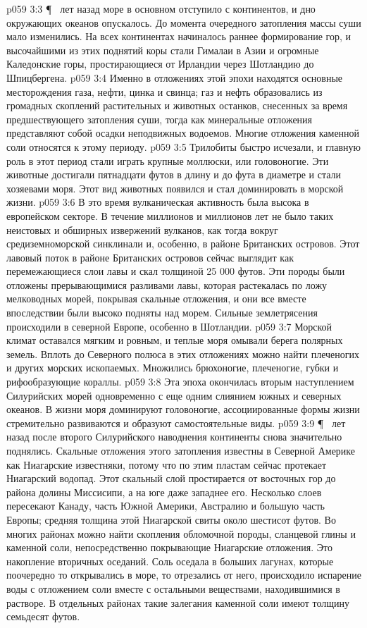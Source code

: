 \vs p059 3:3 \P\  лет назад море в основном отступило с континентов, и дно окружающих океанов опускалось. До момента очередного затопления массы суши мало изменились. На всех континентах начиналось раннее формирование гор, и высочайшими из этих поднятий коры стали Гималаи в Азии и огромные Каледонские горы, простирающиеся от Ирландии через Шотландию до Шпицбергена.
\vs p059 3:4 Именно в отложениях этой эпохи находятся основные месторождения газа, нефти, цинка и свинца; газ и нефть образовались из громадных скоплений растительных и животных останков, снесенных за время предшествующего затопления суши, тогда как минеральные отложения представляют собой осадки неподвижных водоемов. Многие отложения каменной соли относятся к этому периоду.
\vs p059 3:5 Трилобиты быстро исчезали, и главную роль в этот период стали играть крупные моллюски, или головоногие. Эти животные достигали пятнадцати футов в длину и до фута в диаметре и стали хозяевами моря. Этот вид животных появился  и стал доминировать в морской жизни.
\vs p059 3:6 В это время вулканическая активность была высока в европейском секторе. В течение миллионов и миллионов лет не было таких неистовых и обширных извержений вулканов, как тогда вокруг средиземноморской синклинали и, особенно, в районе Британских островов. Этот лавовый поток в районе Британских островов сейчас выглядит как перемежающиеся слои лавы и скал толщиной 25 000 футов. Эти породы были отложены прерывающимися разливами лавы, которая растекалась по ложу мелководных морей, покрывая скальные отложения, и они все вместе впоследствии были высоко подняты над морем. Сильные землетрясения происходили в северной Европе, особенно в Шотландии.
\vs p059 3:7 Морской климат оставался мягким и ровным, и теплые моря омывали берега полярных земель. Вплоть до Северного полюса в этих отложениях можно найти плеченогих и других морских ископаемых. Множились брюхоногие, плеченогие, губки и рифообразующие кораллы.
\vs p059 3:8 Эта эпоха окончилась вторым наступлением Силурийских морей одновременно с еще одним слиянием южных и северных океанов. В жизни моря доминируют головоногие, ассоциированные формы жизни стремительно развиваются и образуют самостоятельные виды.
\vs p059 3:9 \P\  лет назад после второго Силурийского наводнения континенты снова значительно поднялись. Скальные отложения этого затопления известны в Северной Америке как Ниагарские известняки, потому что по этим пластам сейчас протекает Ниагарский водопад. Этот скальный слой простирается от восточных гор до района долины Миссисипи, а на юге даже западнее его. Несколько слоев пересекают Канаду, часть Южной Америки, Австралию и большую часть Европы; средняя толщина этой Ниагарской свиты около шестисот футов. Во многих районах можно найти скопления обломочной породы, сланцевой глины и каменной соли, непосредственно покрывающие Ниагарские отложения. Это накопление вторичных оседаний. Соль оседала в больших лагунах, которые поочередно то открывались в море, то отрезались от него, происходило испарение воды с отложением соли вместе с остальными веществами, находившимися в растворе. В отдельных районах такие залегания каменной соли имеют толщину семьдесят футов.

